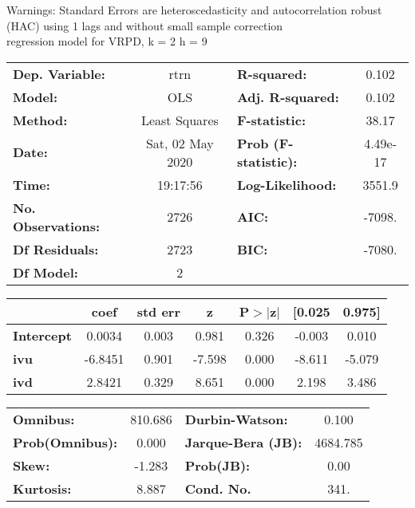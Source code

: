 Warnings: \newline
 [1] Standard Errors are heteroscedasticity and autocorrelation robust (HAC) using 1 lags and without small sample correction\\ 

regression model for VRPD, k = 2 h = 9\begin{center}
\begin{tabular}{lclc}
\toprule
\textbf{Dep. Variable:}    &       rtrn       & \textbf{  R-squared:         } &     0.102   \\
\textbf{Model:}            &       OLS        & \textbf{  Adj. R-squared:    } &     0.102   \\
\textbf{Method:}           &  Least Squares   & \textbf{  F-statistic:       } &     38.17   \\
\textbf{Date:}             & Sat, 02 May 2020 & \textbf{  Prob (F-statistic):} &  4.49e-17   \\
\textbf{Time:}             &     19:17:56     & \textbf{  Log-Likelihood:    } &    3551.9   \\
\textbf{No. Observations:} &        2726      & \textbf{  AIC:               } &    -7098.   \\
\textbf{Df Residuals:}     &        2723      & \textbf{  BIC:               } &    -7080.   \\
\textbf{Df Model:}         &           2      & \textbf{                     } &             \\
\bottomrule
\end{tabular}
\begin{tabular}{lcccccc}
                   & \textbf{coef} & \textbf{std err} & \textbf{z} & \textbf{P$> |$z$|$} & \textbf{[0.025} & \textbf{0.975]}  \\
\midrule
\textbf{Intercept} &       0.0034  &        0.003     &     0.981  &         0.326        &       -0.003    &        0.010     \\
\textbf{ivu}       &      -6.8451  &        0.901     &    -7.598  &         0.000        &       -8.611    &       -5.079     \\
\textbf{ivd}       &       2.8421  &        0.329     &     8.651  &         0.000        &        2.198    &        3.486     \\
\bottomrule
\end{tabular}
\begin{tabular}{lclc}
\textbf{Omnibus:}       & 810.686 & \textbf{  Durbin-Watson:     } &    0.100  \\
\textbf{Prob(Omnibus):} &   0.000 & \textbf{  Jarque-Bera (JB):  } & 4684.785  \\
\textbf{Skew:}          &  -1.283 & \textbf{  Prob(JB):          } &     0.00  \\
\textbf{Kurtosis:}      &   8.887 & \textbf{  Cond. No.          } &     341.  \\
\bottomrule
\end{tabular}
\end{center}

